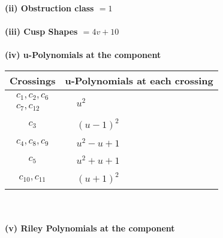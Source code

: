 \documentclass[1p]{elsarticle_modified}
\theoremstyle{definition}
\begin{document}
\flushleft \textbf{(ii) Obstruction class $= 1$}\\~\\
\flushleft \textbf{(iii) Cusp Shapes $= 4 v+10$}\\~\\
\newpage\renewcommand{\arraystretch}{1}
\flushleft \textbf{(iv) u-Polynomials at the component}\newline \\
\begin{tabular}{m{50pt}|m{274pt}}
Crossings & \hspace{64pt}u-Polynomials at each crossing \\
\hline $$\begin{aligned}c_{1},c_{2},c_{6}\\c_{7},c_{12}\end{aligned}$$&$\begin{aligned}
&u^2
\end{aligned}$\\
\hline $$\begin{aligned}c_{3}\end{aligned}$$&$\begin{aligned}
&(u-1)^2
\end{aligned}$\\
\hline $$\begin{aligned}c_{4},c_{8},c_{9}\end{aligned}$$&$\begin{aligned}
&u^2- u+1
\end{aligned}$\\
\hline $$\begin{aligned}c_{5}\end{aligned}$$&$\begin{aligned}
&u^2+u+1
\end{aligned}$\\
\hline $$\begin{aligned}c_{10},c_{11}\end{aligned}$$&$\begin{aligned}
&(u+1)^2
\end{aligned}$\\
\hline
\end{tabular}\\~\\
\newpage\renewcommand{\arraystretch}{1}
\flushleft \textbf{(v) Riley Polynomials at the component}\newline \\
\end{document}
